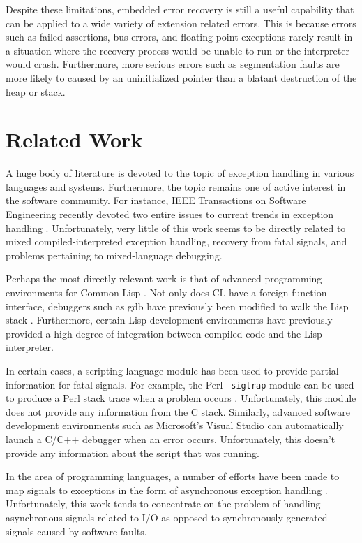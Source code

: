 Despite these limitations, embedded error recovery is still a useful
capability that can be applied to a wide variety of extension related
errors.  This is because errors such as failed assertions, bus errors,
and floating point exceptions rarely result in a situation where the
recovery process would be unable to run or the interpreter would
crash. Furthermore, more serious errors such as segmentation faults
are more likely to caused by an uninitialized pointer than a blatant
destruction of the heap or stack.

\section{Related Work}

A huge body of literature is devoted to the topic of exception
handling in various languages and systems.  Furthermore, the topic
remains one of active interest in the software community. For
instance, IEEE Transactions on Software Engineering recently devoted
two entire issues to current trends in exception handling
\cite{except1,except2}.  Unfortunately, very little of this work seems
to be directly related to mixed compiled-interpreted exception
handling, recovery from fatal signals, and problems pertaining to 
mixed-language debugging.

Perhaps the most directly relevant work is that of advanced programming 
environments for Common Lisp \cite{lisp}.  Not only does CL have a foreign function interface,
debuggers such as gdb have previously been modified to walk the Lisp stack
\cite{ffi,wcl}.  Furthermore, certain Lisp development environments have
previously provided a high degree of integration between compiled code and
the Lisp interpreter\cite{gabriel}.

In certain cases, a scripting language module has been used to provide
partial information for fatal signals. For example, the Perl {\tt
sigtrap} module can be used to produce a Perl stack trace when a
problem occurs \cite{perl}.  Unfortunately, this module does not
provide any information from the C stack.   Similarly, advanced software development
environments such as Microsoft's Visual Studio can automatically launch a C/C++ 
debugger when an error occurs.  Unfortunately, this doesn't provide any information
about the script that was running.

In the area of programming languages, a number of efforts have been made to
map signals to exceptions in the form of asynchronous exception handling 
\cite{buhr,ml,haskell}.  Unfortunately, this work tends to 
concentrate on the problem of handling asynchronous signals related to I/O as opposed
to synchronously generated signals caused by software faults.

